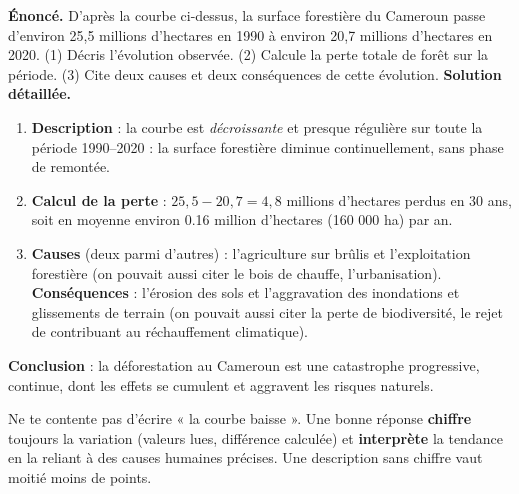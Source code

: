 \documentclass[11pt]{article}
\begin{document}
\begin{exoresolu}
\textbf{Énoncé.} D'après la courbe ci-dessus, la surface forestière du Cameroun passe d'environ 25,5 millions d'hectares en 1990 à environ 20,7 millions d'hectares en 2020. (1) Décris l'évolution observée. (2) Calcule la perte totale de forêt sur la période. (3) Cite deux causes et deux conséquences de cette évolution.
\tcblower
\textbf{Solution détaillée.}
\begin{enumerate}
\item \textbf{Description} : la courbe est \emph{décroissante} et presque régulière sur toute la période 1990--2020 : la surface forestière diminue continuellement, sans phase de remontée.
\item \textbf{Calcul de la perte} : $25,5 - 20,7 = 4,8$ millions d'hectares perdus en 30 ans, soit en moyenne environ \num{0,16} million d'hectares (160 000 ha) par an.
\item \textbf{Causes} (deux parmi d'autres) : l'agriculture sur brûlis et l'exploitation forestière (on pouvait aussi citer le bois de chauffe, l'urbanisation). \textbf{Conséquences} : l'érosion des sols et l'aggravation des inondations et glissements de terrain (on pouvait aussi citer la perte de biodiversité, le rejet de  contribuant au réchauffement climatique).
\end{enumerate}
\textbf{Conclusion} : la déforestation au Cameroun est une catastrophe progressive, continue, dont les effets se cumulent et aggravent les risques naturels.
\end{exoresolu}

\begin{attention}
Ne te contente pas d'écrire « la courbe baisse ». Une bonne réponse \textbf{chiffre} toujours la variation (valeurs lues, différence calculée) et \textbf{interprète} la tendance en la reliant à des causes humaines précises. Une description sans chiffre vaut moitié moins de points.
\end{attention}
\end{document}
